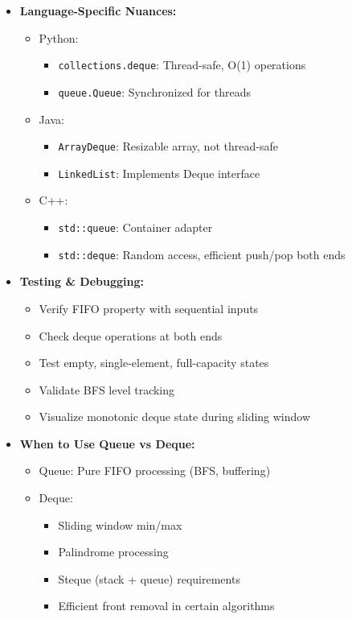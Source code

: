 \documentclass[a4paper,10pt]{book}
\begin{document}
\begin{itemize}
    \item \textbf{Language-Specific Nuances:}
    \begin{itemize}
        \item Python:
        \begin{itemize}
            \item \texttt{collections.deque}: Thread-safe, O(1) operations
            \item \texttt{queue.Queue}: Synchronized for threads
        \end{itemize}
        \item Java:
        \begin{itemize}
            \item \texttt{ArrayDeque}: Resizable array, not thread-safe
            \item \texttt{LinkedList}: Implements Deque interface
        \end{itemize}
        \item C++:
        \begin{itemize}
            \item \texttt{std::queue}: Container adapter
            \item \texttt{std::deque}: Random access, efficient push/pop both ends
        \end{itemize}
    \end{itemize}
    
    \item \textbf{Testing \& Debugging:}
    \begin{itemize}
        \item Verify FIFO property with sequential inputs
        \item Check deque operations at both ends
        \item Test empty, single-element, full-capacity states
        \item Validate BFS level tracking
        \item Visualize monotonic deque state during sliding window
    \end{itemize}
    
    \item \textbf{When to Use Queue vs Deque:}
    \begin{itemize}
        \item Queue: Pure FIFO processing (BFS, buffering)
        \item Deque:
        \begin{itemize}
            \item Sliding window min/max
            \item Palindrome processing
            \item Steque (stack + queue) requirements
            \item Efficient front removal in certain algorithms
        \end{itemize}
    \end{itemize}
    

\end{itemize}
\end{document}
